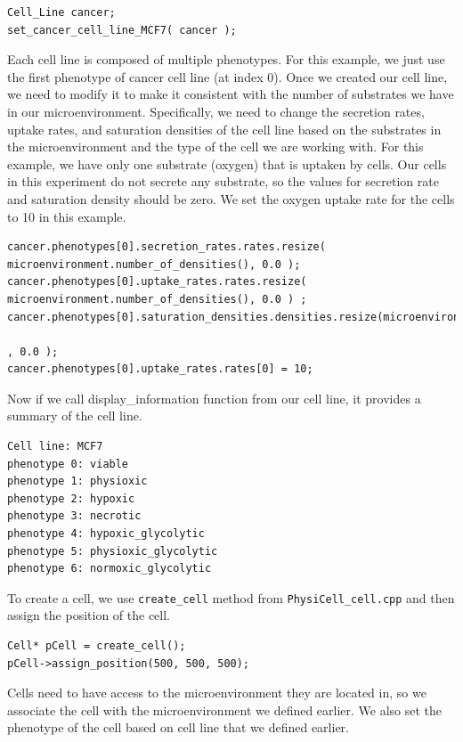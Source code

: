 \documentclass[11pt]{article}
\begin{document}
\begin{verbatim}
Cell_Line cancer;
set_cancer_cell_line_MCF7( cancer );
\end{verbatim}

Each cell line is composed of multiple phenotypes. For this example, we just use the first phenotype of cancer cell line (at index 0). Once we
created our cell line, we need to modify it to make it consistent with the number of substrates we have in our microenvironment.
Specifically, we need to change the secretion rates, uptake rates, and saturation densities of the cell line based on the
substrates in the microenvironment and the type of the cell we are working with. For this example, we have only one substrate (oxygen)
that is uptaken by cells. Our cells in this experiment do not secrete any substrate, so the values for secretion rate and saturation density should be zero.
We set the oxygen uptake rate for the cells to 10 in this example.

\begin{verbatim}
cancer.phenotypes[0].secretion_rates.rates.resize( microenvironment.number_of_densities(), 0.0 );
cancer.phenotypes[0].uptake_rates.rates.resize( microenvironment.number_of_densities(), 0.0 ) ;
cancer.phenotypes[0].saturation_densities.densities.resize(microenvironment.number_of_densities()
                                                                                        , 0.0 );
cancer.phenotypes[0].uptake_rates.rates[0] = 10;
\end{verbatim}

Now if we call display\_information function from our cell line, it provides a summary of the cell line.

\begin{verbatim}
Cell line: MCF7
phenotype 0: viable
phenotype 1: physioxic
phenotype 2: hypoxic
phenotype 3: necrotic
phenotype 4: hypoxic_glycolytic
phenotype 5: physioxic_glycolytic
phenotype 6: normoxic_glycolytic
\end{verbatim}

To create a cell, we use \verb:create_cell: method from \verb:PhysiCell_cell.cpp:
and then assign the position of the cell.

\begin{verbatim}
Cell* pCell = create_cell();
pCell->assign_position(500, 500, 500);
\end{verbatim}

Cells need to have access to the microenvironment they are located in, so we associate the cell with the microenvironment we defined earlier.
We also set the phenotype of the cell based on cell line that we defined earlier.
\end{document}
